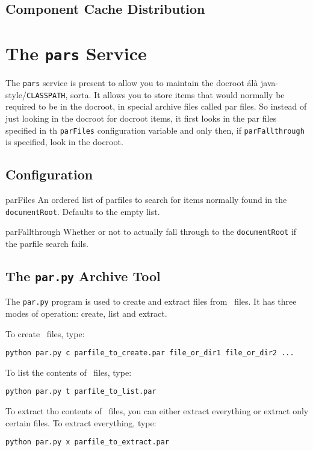 \documentclass{manual}
\begin{document}
\section{Component Cache Distribution}
\label{ccdist}

\chapter{The \texttt{pars} Service}
The \texttt{pars} service is present to allow you to maintain the
docroot \'al\`a java-style/\texttt{CLASSPATH}, sorta.  It allows you
to store items that would normally be required to be in the docroot,
in special archive files called par files.  So instead of just looking
in the docroot for docroot items, it first looks in the par files
specified in th \texttt{parFiles} configuration variable and only
then, if \texttt{parFallthrough} is specified, look in the docroot.

\section{Configuration}
\begin{datadesc}{parFiles} An ordered list of parfiles to search for items
normally found in the \texttt{documentRoot}.  Defaults to the empty
list. \nolocation
\end{datadesc}
\begin{datadesc}{parFallthrough} Whether or not to actually fall through to the
\texttt{documentRoot} if the parfile search fails.
\end{datadesc}

\section{The \texttt{par.py} Archive Tool}
The \texttt{par.py} program is used to create and extract files from
\PAR\ files.  It has three modes of operation: create, list and
extract.

To create \PAR\ files, type:
\begin{verbatim}
python par.py c parfile_to_create.par file_or_dir1 file_or_dir2 ...
\end{verbatim}

To list the contents of \PAR\ files, type:
\begin{verbatim}
python par.py t parfile_to_list.par
\end{verbatim}

To extract tho contents of \PAR\ files, you can either extract
everything or extract only certain files.  To extract everything,
type:
\begin{verbatim}
python par.py x parfile_to_extract.par
\end{verbatim}
\end{document}
